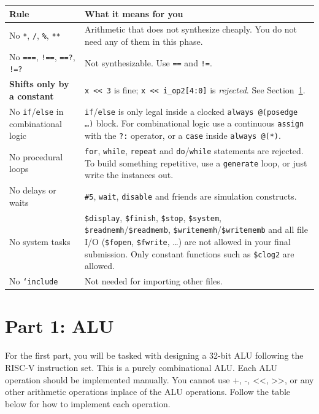 \documentclass[11pt]{article}
\begin{document}
\begin{center}
\begin{tabular}{@{}p{5.4cm}p{8.8cm}@{}}
\toprule
\textbf{Rule} & \textbf{What it means for you} \\
\midrule
No \texttt{*}, \texttt{/}, \texttt{\%}, \texttt{**}
  & Arithmetic that does not synthesize cheaply. You do not need any of them
    in this phase. \\
No \texttt{===}, \texttt{!==}, \texttt{==?}, \texttt{!=?}
  & Not synthesizable. Use \texttt{==} and \texttt{!=}. \\
\textbf{Shifts only by a constant}
  & \texttt{x << 3} is fine; \texttt{x << i\_op2[4:0]} is \emph{rejected}. See
    Section~\ref{sec:alu}. \\
No \texttt{if}/\texttt{else} in combinational logic
  & \texttt{if}/\texttt{else} is only legal inside a clocked
    \texttt{always @(posedge \dots)} block. For combinational logic use a
    continuous \texttt{assign} with the \texttt{?:} operator, or a
    \texttt{case} inside \texttt{always @(*)}. \\
No procedural loops
  & \texttt{for}, \texttt{while}, \texttt{repeat} and \texttt{do}/\texttt{while}
    statements are rejected. To build something repetitive, use a
    \texttt{generate} loop, or just write the instances out. \\
No delays or waits
  & \texttt{\#5}, \texttt{wait}, \texttt{disable} and friends are simulation
    constructs. \\
No system tasks
  & \texttt{\$display}, \texttt{\$finish}, \texttt{\$stop}, \texttt{\$system},
    \texttt{\$readmemh}/\texttt{\$readmemb},
    \texttt{\$writememh}/\texttt{\$writememb} and all file I/O
    (\texttt{\$fopen}, \texttt{\$fwrite}, \dots) are not allowed in your final submission. Only
    constant functions such as \texttt{\$clog2} are allowed. \\
No \texttt{`include}
  & Not needed for importing other files. \\
\bottomrule
\end{tabular}
\end{center}

\newpage

\section{Part 1: ALU}
\label{sec:alu}
For the first part, you will be tasked with designing a 32-bit ALU following the RISC-V instruction set. This is a purely combinational ALU. Each ALU operation should be implemented manually. You cannot use +, -, \textless\textless, \textgreater\textgreater, or any other arithmetic operations inplace of the ALU operations. Follow the table below for how to implement each operation.
\end{document}
